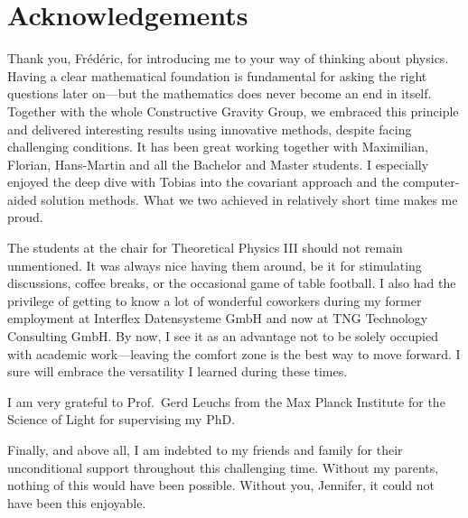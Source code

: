 \chapter{Acknowledgements}

Thank you, Fr\'ed\'eric, for introducing me to your way of thinking about physics. Having a clear mathematical foundation is fundamental for asking the right questions later on---but the mathematics does never become an end in itself. Together with the whole Constructive Gravity Group, we embraced this principle and delivered interesting results using innovative methods, despite facing challenging conditions. It has been great working together with Maximilian, Florian, Hans-Martin and all the Bachelor and Master students. I especially enjoyed the deep dive with Tobias into the covariant approach and the computer-aided solution methods. What we two achieved in relatively short time makes me proud.

The students at the chair for Theoretical Physics III should not remain unmentioned. It was always nice having them around, be it for stimulating discussions, coffee breaks, or the occasional game of table football. I also had the privilege of getting to know a lot of wonderful coworkers during my former employment at Interflex Datensysteme GmbH and now at TNG Technology Consulting GmbH. By now, I see it as an advantage not to be solely occupied with academic work---leaving the comfort zone is the best way to move forward. I sure will embrace the versatility I learned during these times.

I am very grateful to Prof.~Gerd Leuchs from the Max Planck Institute for the Science of Light for supervising my PhD.

Finally, and above all, I am indebted to my friends and family for their unconditional support throughout this challenging time. Without my parents, nothing of this would have been possible. Without you, Jennifer, it could not have been this enjoyable.

